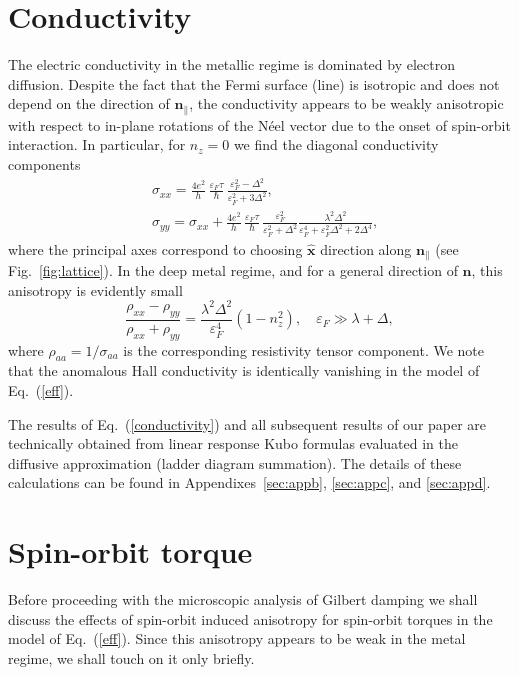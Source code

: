 \documentclass[%
  twocolumn,
  aps,
  prb,
  amsmath,
  amssymb,
  superscriptaddress,
  nofootinbib,
  floatfix
]{revtex4-1}
\newcommand{\be}{\begin{equation}}
\newcommand{\e}{\end{equation}}
\newcommand{\beml}{\begin{subequations}}
\newcommand{\eml}{\end{subequations}}
\newcommand{\ep}{\varepsilon}
\newcommand{\bb}{\boldsymbol}
\newcommand{\0}{^{\phantom{\dagger}}}
\begin{document}
\section{Conductivity}\label{sec:cond}
The electric conductivity in the metallic regime is dominated by electron diffusion. Despite the fact that the Fermi surface (line) is isotropic and does not depend on the direction of $\bb{n}_\parallel$, the conductivity appears to be weakly anisotropic with respect to in-plane rotations of the N\'eel vector due to the onset of spin-orbit interaction. 
In particular, for $n_z=0$ we find the diagonal conductivity components
\beml
\label{conductivity}
\begin{align}
\label{eq:long_cond}
&\sigma_{xx}= \frac{4e^2}{h}\,\frac{\ep_F \tau}{\hbar}\,\frac{\ep_F^2-\Delta^2}{\ep_F^2+3\Delta^2},\\
&\sigma_{yy}= \sigma_{xx}+\frac{4e^2}{h}\,\frac{\ep_F \tau}{\hbar}\, \frac{\ep_F^2}{\ep_F^2+\Delta^2}
\frac{\lambda^2\Delta^2}{\ep_F^4+\ep_F^2\Delta^2+2\Delta^4},
\end{align}
\eml
where the principal axes correspond to choosing $\hat{\bm{x}}$ direction along $\bb{n}_\parallel$ (see Fig.~\ref{fig:lattice}). In the deep metal regime, and for a general direction of $\bb{n}$, this anisotropy is evidently small
\be
\label{ani}
\frac{\rho_{xx}-\rho_{yy}}{\rho_{xx}+\rho_{yy}}=\frac{\lambda^2\Delta^2}{\ep_F^4}(1-n_z^2), \quad \ep_F\gg \lambda+\Delta,
\e
where $\rho_{aa}=1/\sigma_{aa}$ is the corresponding resistivity tensor component. We note that the anomalous Hall conductivity is identically vanishing in the model of Eq.~(\ref{eff}). 

The results of Eq.~(\ref{conductivity}) and all subsequent results of our paper are technically obtained from linear response Kubo formulas evaluated in the diffusive approximation (ladder diagram summation). The details of these calculations can be found in Appendixes~\ref{sec:appb}, \ref{sec:appc}, and \ref{sec:appd}. 

\section{Spin-orbit torque}\label{sec:sot}

Before proceeding with the microscopic analysis of Gilbert damping we shall discuss the effects of spin-orbit induced anisotropy for spin-orbit torques in the model of Eq.~(\ref{eff}). Since this anisotropy appears to be weak in the metal regime, we shall touch on it only briefly. 
\end{document}

